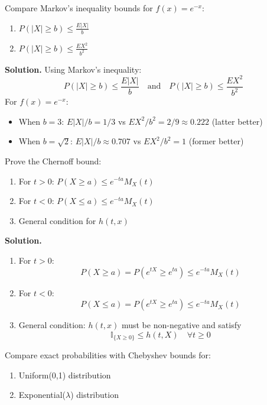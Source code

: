 \begin{problembox}
Compare Markov's inequality bounds for $f(x) = e^{-x}$:
\begin{enumerate}[label=(\alph*)]
\item $P(|X| \geq b) \leq \frac{E|X|}{b}$
\item $P(|X| \geq b) \leq \frac{EX^2}{b^2}$
\end{enumerate}
\end{problembox}

\noindent\textbf{Solution.}
Using Markov's inequality:
\[
P(|X| \geq b) \leq \frac{E|X|}{b} \quad \text{and} \quad P(|X| \geq b) \leq \frac{EX^2}{b^2}
\]
For $f(x) = e^{-x}$:
\begin{itemize}
\item When $b=3$: $E|X|/b = 1/3$ vs $EX^2/b^2 = 2/9 \approx 0.222$ (latter better)
\item When $b=\sqrt{2}$: $E|X|/b \approx 0.707$ vs $EX^2/b^2 = 1$ (former better)
\end{itemize}

\begin{problembox}
Prove the Chernoff bound:
\begin{enumerate}[label=(\alph*)]
\item For $t > 0$: $P(X \geq a) \leq e^{-ta}M_X(t)$
\item For $t < 0$: $P(X \leq a) \leq e^{-ta}M_X(t)$
\item General condition for $h(t,x)$
\end{enumerate}
\end{problembox}

\noindent\textbf{Solution.}
\begin{enumerate}[label=(\alph*)]
\item For $t > 0$:
\[
P(X \geq a) = P(e^{tX} \geq e^{ta}) \leq e^{-ta}M_X(t)
\]

\item For $t < 0$:
\[
P(X \leq a) = P(e^{tX} \geq e^{ta}) \leq e^{-ta}M_X(t)
\]

\item General condition: $h(t,x)$ must be non-negative and satisfy
\[
\mathbb{I}_{\{X \geq 0\}} \leq h(t,X) \quad \forall t \geq 0
\]
\end{enumerate}

\begin{problembox}
Compare exact probabilities with Chebyshev bounds for:
\begin{enumerate}
\item Uniform(0,1) distribution
\item Exponential($\lambda$) distribution
\end{enumerate}
\end{problembox}

